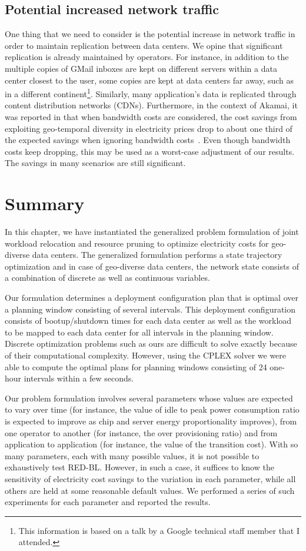 \subsection{Potential increased network traffic}
One thing that we need to consider is the potential increase in network traffic in order to maintain replication between data centers. We opine that significant replication is already maintained by operators. For instance, in addition to the multiple copies of GMail inboxes are kept on different servers within a data center closest to the user, some copies are kept at data centers far away, such as in a different continent\footnote{This information is based on a talk by a Google technical staff member that I attended.}. Similarly, many application's data is replicated through content distribution networks (CDNs). Furthermore, in the context of Akamai, it was reported in that when bandwidth costs are considered, the cost savings from exploiting geo-temporal diversity in electricity prices drop to about one third of the expected savings when ignoring bandwidth costs~\cite{qureshi2009cutting}. Even though bandwidth costs keep dropping, this may be used as a worst-case adjustment of our results. The savings in many scenarios are still significant.

\section{Summary}
In this chapter, we have instantiated the generalized problem formulation of joint workload relocation and resource pruning to optimize electricity costs for geo-diverse data centers. The generalized formulation performs a state trajectory optimization and in case of geo-diverse data centers, the network state consists of a combination of discrete as well as continuous variables. 

Our formulation determines a deployment configuration plan that is optimal over a planning window consisting of several intervals. This deployment configuration consists of bootup/shutdown times for each data center as well as the workload to be mapped to each data center for all intervals in the planning window. Discrete optimization problems such as ours are difficult to solve exactly because of their computational complexity. However, using the CPLEX solver we were able to compute the optimal plans for planning windows consisting of 24 one-hour intervals within a few seconds. 

Our problem formulation involves several parameters whose values are expected to vary over time (for instance, the value of idle to peak power consumption ratio is expected to improve as chip and server energy proportionality improves), from one operator to another (for instance, the over provisioning ratio) and from application to application (for instance, the value of the transition cost). With so many parameters, each with many possible values, it is not possible to exhaustively test RED-BL. However, in such a case, it suffices to know the sensitivity of electricity cost savings to the variation in each parameter, while all others are held at some reasonable default values. We performed a series of such experiments for each parameter and reported the results.

